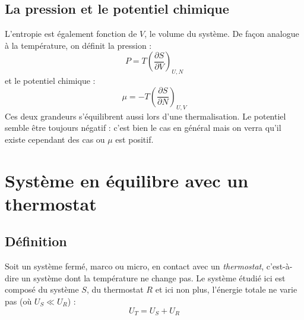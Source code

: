 \documentclass	[11pt, a4paper, openany]{book}
\begin{document}
		
		\section{La pression et le potentiel chimique}
		L'entropie est également fonction de $V$, le volume du système. De façon analogue à la 
		température, on définit la pression :
		\begin{equation}
			P = T\left(\dfrac{\partial S}{\partial V}\right)_{U,N}
		\end{equation}
		et le potentiel chimique :
		\begin{equation}
			\mu = -T\left(\dfrac{\partial S}{\partial N}\right)_{U,V}
		\end{equation}
		Ces deux grandeurs s'équilibrent aussi lors d'une thermalisation. Le potentiel semble être 
		toujours négatif : c'est bien le cas en général mais on verra qu'il existe cependant des 
		cas ou $\mu$ est positif.
		
		
		
		
		
		\chapter{Système en équilibre avec un thermostat}
		\section{Définition}
		Soit un système fermé, marco ou micro, en contact avec un \textit{thermostat}, c'est-à-dire
		un système dont la température ne change pas. Le système étudié ici est composé du système 
		$S$, du thermostat $R$ et ici non plus, l'énergie totale ne varie pas (où $U_S \ll U_R$) :
		\begin{equation}
			U_T = U_S + U_R
		\end{equation}
		
\end{document}
